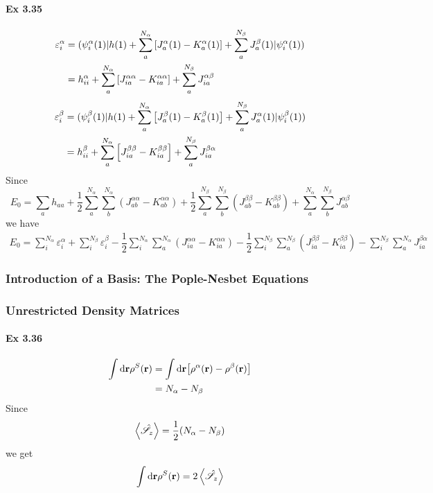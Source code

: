 \documentclass[a4paper]{article}
\newcommand{\hsS}{\hat{\mathscr{S}}}
\newcommand{\ex}[1]{\paragraph{Ex #1}}
\numberwithin{equation}{subsection}
\begin{document}
\ex{3.35}
\begin{align}
\varepsilon_i^\alpha &= (\psi_i^\alpha(1) | h(1) + \sum_a^{N_\alpha}\qty[J_a^\alpha(1) - K_a^{\alpha}(1) ] + \sum_a^{N_\beta} J_a^\beta(1) | \psi_i^\alpha(1)) \notag\\
&= h_{ii}^\alpha + \sum_a^{N_\alpha}\qty[J_{ia}^{\alpha\alpha} - K_{ia}^{\alpha\alpha}] + \sum_a^{N_\beta} J_{ia}^{\alpha\beta}
\end{align}
\begin{align}
\varepsilon_i^\beta &= (\psi_i^\beta(1) | h(1) + \sum_a^{N_\alpha}\qty[J_a^\beta(1) - K_a^{\beta}(1) ] + \sum_a^{N_\beta} J_a^\alpha(1) | \psi_i^\beta(1)) \notag\\
&= h_{ii}^\beta + \sum_a^{N_\alpha}\qty[J_{ia}^{\beta\beta} - K_{ia}^{\beta\beta}] + \sum_a^{N_\beta} J_{ia}^{\beta\alpha}
\end{align}
Since
\begin{equation}\label{key}
E_0 = \sum_a h_{aa} + \dfrac{1}{2}\sum_a^{N_\alpha}\sum_b^{N_\alpha} (J_{ab}^{\alpha\alpha} - K_{ab}^{\alpha\alpha}) + \dfrac{1}{2}\sum_a^{N_\beta}\sum_b^{N_\beta} (J_{ab}^{\beta\beta} - K_{ab}^{\beta\beta}) 
+ \sum_a^{N_\alpha}\sum_b^{N_\beta} J_{ab}^{\alpha\beta}
\end{equation}
we have
\begin{align}
E_0 = \sum_i^{N_\alpha} \varepsilon_i^\alpha 
+ \sum_i^{N_\beta} \varepsilon_i^\beta 
- \dfrac{1}{2}\sum_i^{N_\alpha}\sum_a^{N_\alpha} (J_{ia}^{\alpha\alpha} - K_{ia}^{\alpha\alpha}) 
- \dfrac{1}{2}\sum_i^{N_\beta}\sum_a^{N_\beta} (J_{ia}^{\beta\beta} - K_{ia}^{\beta\beta}) 
- \sum_i^{N_\beta}\sum_a^{N_\alpha} J_{ia}^{\beta\alpha}
\end{align}

\subsubsection{Introduction of a Basis: The Pople-Nesbet Equations}

\subsubsection{Unrestricted Density Matrices}
\ex{3.36}
\begin{align}
\int\dd\vb{r} \rho^S(\vb{r}) &= \int\dd\vb{r} \qty[\rho^\alpha(\vb{r}) - \rho^\beta(\vb{r})] \\
&= N_\alpha - N_\beta
\end{align}
Since
\begin{equation}\label{key}
\ev{\hsS_z} = \dfrac{1}{2}(N_\alpha - N_\beta)
\end{equation}
we get
\begin{equation}\label{key}
\int\dd\vb{r} \rho^S(\vb{r}) = 2\ev{\hsS_z}
\end{equation}
\end{document}
